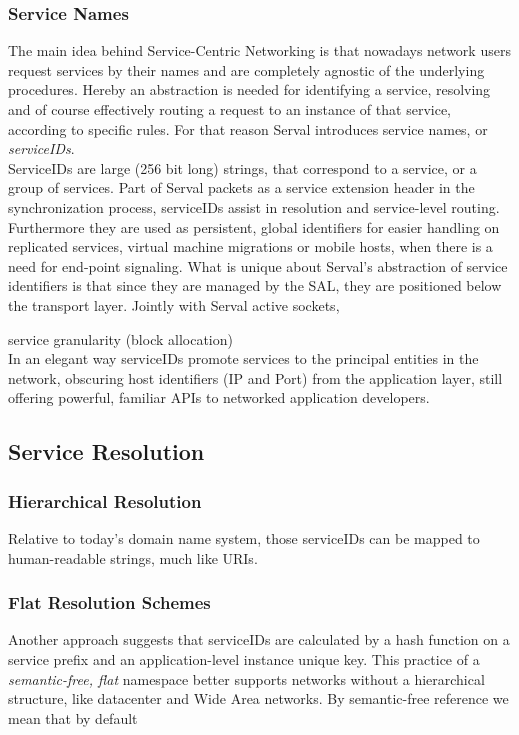 \subsubsection{Service Names}
The main idea behind Service-Centric Networking is that nowadays network users request services by their names and are completely agnostic of the underlying procedures.
Hereby an abstraction is needed for identifying a service, resolving and of course effectively routing a request to an instance of that service, according to specific rules.
For that reason Serval introduces service names, or \emph{serviceIDs}.\\
\indent ServiceIDs are large (256 bit long) strings, that correspond to a service, or a group of services.
Part of Serval packets as a service extension header in the synchronization process, serviceIDs assist in resolution and service-level routing.
Furthermore they are used as persistent, global identifiers for easier handling on replicated services, virtual machine migrations or mobile hosts, when there is a need for end-point signaling.
\indent What is unique about Serval's abstraction of service identifiers is that since they are managed by the SAL, they are positioned below the transport layer.
Jointly with Serval active sockets, 

\indent service granularity (block allocation) \\
\indent In an elegant way serviceIDs promote services to the principal entities in the network, obscuring host identifiers (IP and Port) from the application layer, still offering powerful, familiar APIs to networked application developers.

\subsection{Service Resolution}
\subsubsection{Hierarchical Resolution}  Relative to today's domain name system, those serviceIDs can be mapped to human-readable strings, much like URIs.


\subsubsection{Flat Resolution Schemes} Another approach suggests that serviceIDs are calculated by a hash function on a service prefix and an application-level instance unique key.
This practice of a \emph{semantic-free, flat} namespace better supports networks without a hierarchical structure, like datacenter and Wide Area networks.
By semantic-free\cite{Walfisha2004} reference we mean that by default 



